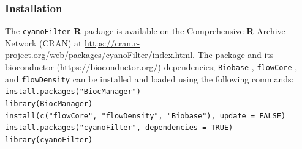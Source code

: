 \documentclass[a4paper,12pt]{extarticle}
\begin{document}
\subsubsection*{Installation}
The \texttt{cyanoFilter} \textbf{R} package is available on the Comprehensive \textbf{R} Archive Network (CRAN) at \url{https://cran.r-project.org/web/packages/cyanoFilter/index.html}. The package and its bioconductor (\url{https://bioconductor.org/}) dependencies; \texttt{Biobase}  \citep{biobase:2015}, \texttt{flowCore} \citep{flowCore:2019}, and \texttt{flowDensity} \citep{Malek:2015a} can be installed and loaded using the following commands:\\
\texttt{install.packages("BiocManager")\\
	library(BiocManager)\\
	install(c("flowCore", "flowDensity", "Biobase"), update = FALSE)\\
	install.packages("cyanoFilter", dependencies = TRUE)\\
	library(cyanoFilter)
}







\end{document}
